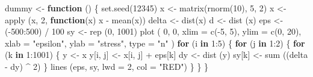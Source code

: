 \documentclass[
  12pt,
]{book}
\newenvironment{Shaded}{\begin{snugshade}}{\end{snugshade}}
\newcommand{\AttributeTok}[1]{\textcolor[rgb]{0.77,0.63,0.00}{#1}}
\newcommand{\ControlFlowTok}[1]{\textcolor[rgb]{0.13,0.29,0.53}{\textbf{#1}}}
\newcommand{\DecValTok}[1]{\textcolor[rgb]{0.00,0.00,0.81}{#1}}
\newcommand{\FunctionTok}[1]{\textcolor[rgb]{0.00,0.00,0.00}{#1}}
\newcommand{\NormalTok}[1]{#1}
\newcommand{\OtherTok}[1]{\textcolor[rgb]{0.56,0.35,0.01}{#1}}
\newcommand{\SpecialCharTok}[1]{\textcolor[rgb]{0.00,0.00,0.00}{#1}}
\newcommand{\StringTok}[1]{\textcolor[rgb]{0.31,0.60,0.02}{#1}}
\theoremstyle{definition}
\theoremstyle{definition}
\theoremstyle{definition}
\theoremstyle{definition}
\theoremstyle{remark}
\begin{document}
\begin{Shaded}
\begin{Highlighting}[]
\NormalTok{dummy }\OtherTok{\textless{}{-}} \ControlFlowTok{function}\NormalTok{ () \{}
  \FunctionTok{set.seed}\NormalTok{(}\DecValTok{12345}\NormalTok{)}
\NormalTok{  x }\OtherTok{\textless{}{-}} \FunctionTok{matrix}\NormalTok{(}\FunctionTok{rnorm}\NormalTok{(}\DecValTok{10}\NormalTok{), }\DecValTok{5}\NormalTok{, }\DecValTok{2}\NormalTok{)}
\NormalTok{  x }\OtherTok{\textless{}{-}} \FunctionTok{apply}\NormalTok{ (x, }\DecValTok{2}\NormalTok{, }\ControlFlowTok{function}\NormalTok{(x)}
\NormalTok{    x }\SpecialCharTok{{-}} \FunctionTok{mean}\NormalTok{(x))}
\NormalTok{  delta }\OtherTok{\textless{}{-}} \FunctionTok{dist}\NormalTok{(x)}
\NormalTok{  d }\OtherTok{\textless{}{-}} \FunctionTok{dist}\NormalTok{ (x)}
\NormalTok{  eps }\OtherTok{\textless{}{-}}\NormalTok{ (}\SpecialCharTok{{-}}\DecValTok{500}\SpecialCharTok{:}\DecValTok{500}\NormalTok{) }\SpecialCharTok{/} \DecValTok{100}
\NormalTok{  sy }\OtherTok{\textless{}{-}} \FunctionTok{rep}\NormalTok{ (}\DecValTok{0}\NormalTok{, }\DecValTok{1001}\NormalTok{)}
  \FunctionTok{plot}\NormalTok{ (}
    \DecValTok{0}\NormalTok{,}
    \DecValTok{0}\NormalTok{,}
    \AttributeTok{xlim =} \FunctionTok{c}\NormalTok{(}\SpecialCharTok{{-}}\DecValTok{5}\NormalTok{, }\DecValTok{5}\NormalTok{),}
    \AttributeTok{ylim =} \FunctionTok{c}\NormalTok{(}\DecValTok{0}\NormalTok{, }\DecValTok{20}\NormalTok{),}
    \AttributeTok{xlab =} \StringTok{"epsilon"}\NormalTok{,}
    \AttributeTok{ylab =} \StringTok{"stress"}\NormalTok{,}
    \AttributeTok{type =} \StringTok{"n"}
\NormalTok{  )}
  \ControlFlowTok{for}\NormalTok{ (i }\ControlFlowTok{in} \DecValTok{1}\SpecialCharTok{:}\DecValTok{5}\NormalTok{) \{}
    \ControlFlowTok{for}\NormalTok{ (j }\ControlFlowTok{in} \DecValTok{1}\SpecialCharTok{:}\DecValTok{2}\NormalTok{) \{}
      \ControlFlowTok{for}\NormalTok{ (k }\ControlFlowTok{in} \DecValTok{1}\SpecialCharTok{:}\DecValTok{1001}\NormalTok{) \{}
\NormalTok{        y }\OtherTok{\textless{}{-}}\NormalTok{ x}
\NormalTok{        y[i, j] }\OtherTok{\textless{}{-}}\NormalTok{ x[i, j] }\SpecialCharTok{+}\NormalTok{ eps[k]}
\NormalTok{        dy }\OtherTok{\textless{}{-}} \FunctionTok{dist}\NormalTok{ (y)}
\NormalTok{        sy[k] }\OtherTok{\textless{}{-}} \FunctionTok{sum}\NormalTok{ ((delta }\SpecialCharTok{{-}}\NormalTok{ dy) }\SpecialCharTok{\^{}} \DecValTok{2}\NormalTok{)}
\NormalTok{      \}}
      \FunctionTok{lines}\NormalTok{ (eps, sy, }\AttributeTok{lwd =} \DecValTok{2}\NormalTok{, }\AttributeTok{col =} \StringTok{"RED"}\NormalTok{)}
\NormalTok{    \}}
\NormalTok{  \}}
\NormalTok{\}}



\end{Highlighting}
\end{Shaded}
\end{document}
